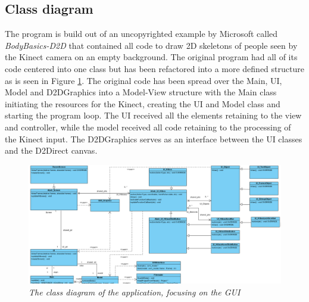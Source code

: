\subsection{Class diagram}

The program is build out of an uncopyrighted example by Microsoft called \emph{BodyBasics-D2D} that contained all code to draw 2D skeletons of people seen by the Kinect camera on an empty background. The original program had all of its code centered into one class but has been refactored into a more defined structure as is seen in Figure \ref{fig: gui_classdiagram}. The original code has been spread over the Main, UI, Model and D2D\textunderscore Graphics into a Model-View structure with the Main class initiating the resources for the Kinect, creating the UI and Model class and starting the program loop. The UI received all the elements retaining to the view and controller, while the model received all code retaining to the processing of the Kinect input. The D2D\textunderscore Graphics serves as an interface between the UI classes and the D2Direct canvas.

\begin{figure}[H]
	\begin{center}
		\includegraphics[width=14cm]{figures/UML_UI.png}
		\caption{\emph{The class diagram of the application, focusing on the GUI}}
		\label{fig: gui_classdiagram}
	\end{center}
\end{figure}

